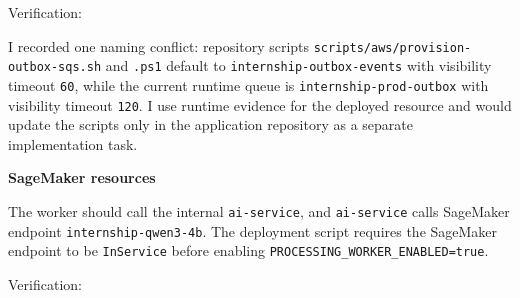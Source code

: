 Verification:

\begin{Shaded}
\begin{Highlighting}[]
 \OperatorTok{\textless{}}\OperatorTok{\textgreater{}}
\end{Highlighting}
\end{Shaded}

I recorded one naming conflict: repository scripts
\texttt{scripts/\allowbreak{}aws/\allowbreak{}provision-\allowbreak{}outbox-\allowbreak{}sqs.\allowbreak{}sh} and \texttt{.\allowbreak{}ps1} default
to \texttt{internship-\allowbreak{}outbox-\allowbreak{}events} with visibility timeout
\texttt{60}, while the current runtime queue is
\texttt{internship-\allowbreak{}prod-\allowbreak{}outbox} with visibility timeout \texttt{120}. I
use runtime evidence for the deployed resource and would update the
scripts only in the application repository as a separate implementation
task.

\vspace{0.5em}\noindent\textbf{SageMaker resources}\par

The worker should call the internal \texttt{ai-\allowbreak{}service}, and
\texttt{ai-\allowbreak{}service} calls SageMaker endpoint
\texttt{internship-\allowbreak{}qwen3-\allowbreak{}4b}. The deployment script requires the
SageMaker endpoint to be \texttt{InService} before enabling
\texttt{PROCESSING\_\allowbreak{}WORKER\_\allowbreak{}ENABLED=true}.

Verification:

